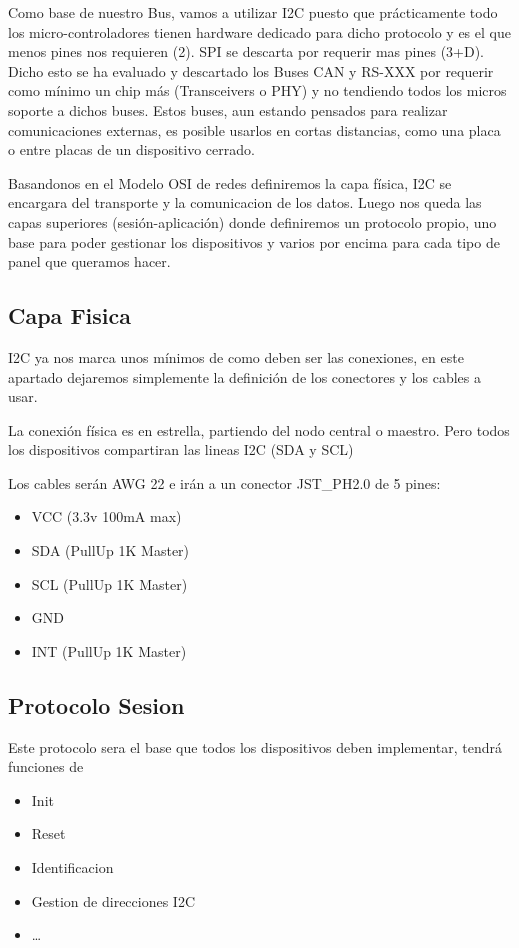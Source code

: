 Como base de nuestro Bus, vamos a utilizar I2C puesto que prácticamente todo los micro-controladores tienen
hardware dedicado para dicho protocolo y es el que menos pines nos requieren (2). SPI se descarta por requerir
mas pines (3+D). Dicho esto se ha evaluado y descartado los Buses CAN y RS-XXX por requerir como mínimo un chip
más (Transceivers o PHY) y no tendiendo todos los micros soporte a dichos buses. Estos buses, aun estando
pensados para realizar comunicaciones externas, es posible usarlos en cortas distancias, como una placa o entre
placas de un dispositivo cerrado.

Basandonos en el Modelo OSI de redes definiremos la capa física, I2C se encargara del transporte y la
comunicacion de los datos. Luego nos queda las capas superiores (sesión-aplicación) donde definiremos un
protocolo propio, uno base para poder gestionar los dispositivos y varios por encima para cada tipo de panel
que queramos hacer.

\subsection{Capa Fisica}
I2C ya nos marca unos mínimos de como deben ser las conexiones, en este apartado dejaremos simplemente la
definición de los conectores y los cables a usar.

La conexión física es en estrella, partiendo del nodo central o maestro. Pero todos los dispositivos compartiran
las lineas I2C (SDA y SCL)

Los cables serán AWG 22 e irán a un conector JST\_PH2.0 de 5 pines:
\begin{itemize}
    \item VCC (3.3v 100mA max)
    \item SDA (PullUp 1K Master)
    \item SCL (PullUp 1K Master)
    \item GND
    \item INT (PullUp 1K Master)
\end{itemize}


\subsection{Protocolo Sesion}
Este protocolo sera el base que todos los dispositivos deben implementar, tendrá funciones de
\begin{itemize}
    \item Init
    \item Reset
    \item Identificacion
    \item Gestion de direcciones I2C
    \item \dots
\end{itemize}


